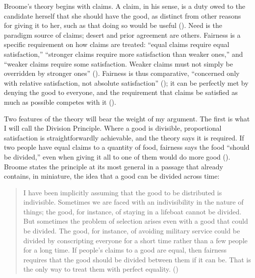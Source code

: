 \documentclass[
  11pt,
  letterpaper,
  DIV=11,
  numbers=noendperiod,
  twoside]{scrartcl}
\begin{document}
Broome's theory begins with claims. A claim, in his sense, is a duty
owed to the candidate herself that she should have the good, as distinct
from other reasons for giving it to her, such as that doing so would be
useful (). Need is the
paradigm source of claims; desert and prior agreement are others.
Fairness is a specific requirement on how claims are treated: ``equal
claims require equal satisfaction,'' ``stronger claims require more
satisfaction than weaker ones,'' and ``weaker claims require some
satisfaction. Weaker claims must not simply be overridden by stronger
ones'' (). Fairness is thus
comparative, ``concerned only with relative satisfaction, not absolute
satisfaction'' (); it can be
perfectly met by denying the good to everyone, and the requirement that
claims be satisfied as much as possible competes with it
().

Two features of the theory will bear the weight of my argument. The
first is what I will call the Division Principle. Where a good is
divisible, proportional satisfaction is straightforwardly achievable,
and the theory says it is required. If two people have equal claims to a
quantity of food, fairness says the food ``should be divided,'' even
when giving it all to one of them would do more good
(). Broome states the
principle at its most general in a passage that already contains, in
miniature, the idea that a good can be divided across time:

\begin{quote}
I have been implicitly assuming that the good to be distributed is
indivisible. Sometimes we are faced with an indivisibility in the nature
of things; the good, for instance, of staying in a lifeboat cannot be
divided. But sometimes the problem of selection arises even with a good
that could be divided. The good, for instance, of avoiding military
service could be divided by conscripting everyone for a short time
rather than a few people for a long time. If people's claims to a good
are equal, then fairness requires that the good should be divided
between them if it can be. That is the only way to treat them with
perfect equality. ()
\end{quote}
\end{document}
